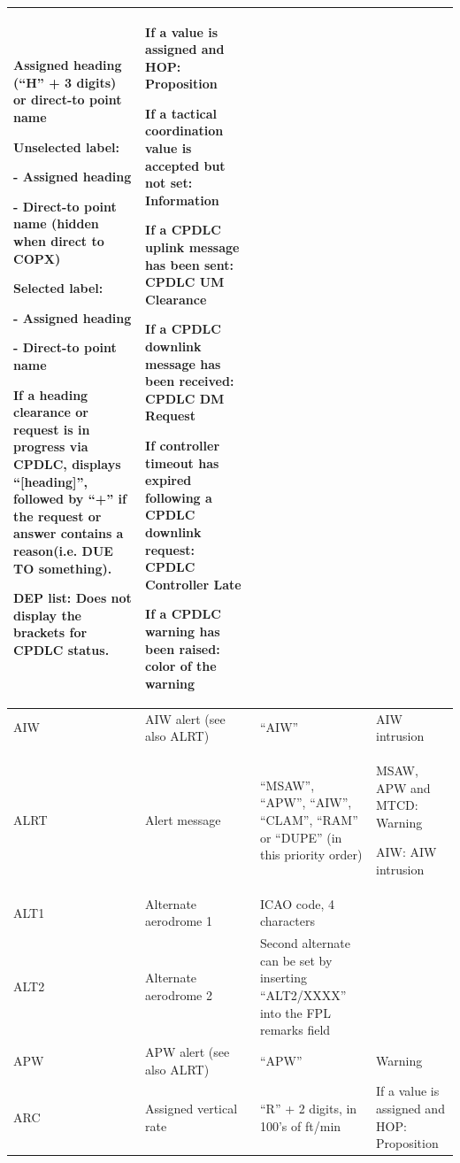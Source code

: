 \documentclass[11pt,a4paper]{memoir}
\begin{document}
\begin{longtable}{|p{2.5cm}|p{2.5cm}|p{4.5cm}|p{4.5cm}|}
      Assigned heading (“H” + 3 digits) or  direct-to point name 
      \bigskip
      
      Unselected label: 
      
      - Assigned heading 
      
      - Direct-to point name (hidden when  direct to COPX) 
      \bigskip
      
      Selected label: 
      
      - Assigned heading 
      
      - Direct-to point name 
      \bigskip
      
      If a heading clearance or request is  in progress via CPDLC, displays  “{[}heading{]}”, followed by “+” if the  request or answer contains a reason(i.e. DUE TO something). 
      \bigskip
     
      DEP list: 
      Does not display the  brackets for CPDLC status. &
      If a value is assigned and  HOP: Proposition 
      \bigskip

      If a tactical coordination value is accepted but not  set: Information 
      \bigskip

      If a CPDLC uplink message  has been sent:  CPDLC UM Clearance 
      \bigskip
      
      If a CPDLC downlink  message has been  received:  CPDLC DM Request 
      \bigskip
      
      If controller timeout has expired following a CPDLC downlink request:  CPDLC Controller Late 
      \bigskip
      
      If a CPDLC warning has  been raised: color of the  warning \\ \hline
    AIW &
      AIW alert (see also ALRT) &
      “AIW” &
      AIW intrusion \\ \hline
    ALRT &
      Alert message &
      “MSAW”, “APW”, “AIW”, “CLAM”,  “RAM” or  “DUPE” (in this priority order) &
      MSAW, APW and MTCD: Warning 
      
      AIW: AIW intrusion \\ \hline
    ALT1 &
      Alternate aerodrome 1 &
      ICAO code, 4 characters &
       \\ \hline
    ALT2 &
      Alternate aerodrome 2 &
      Second alternate can be set by  inserting “ALT2/XXXX” into  the FPL remarks field &
       \\ \hline
    APW &
      APW alert (see also ALRT) &
      “APW” &
      Warning \\ \hline
    ARC &
      Assigned vertical rate &
      “R” + 2 digits, in 100’s of ft/min &
      If a value is assigned and  HOP: Proposition 
      

\end{longtable}
\end{document}
